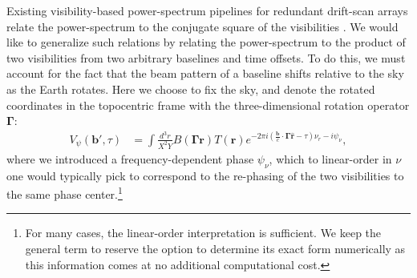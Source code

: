 \documentclass[twocolumn,apj,numberedappendix]{emulateapj}
\renewcommand\[{\begin{equation}}
\renewcommand\]{\end{equation}}
\begin{document}
Existing visibility-based power-spectrum pipelines for redundant drift-scan  arrays relate the power-spectrum to the conjugate square of the visibilities \citep{delay-transform, paper32, Ali2015}. We would like to generalize such relations by relating the power-spectrum to the product of two visibilities from two arbitrary baselines and time offsets. 
To do this, we must account for the fact that the beam pattern of a baseline shifts relative to the sky as the Earth rotates. Here we choose to fix the sky, and denote the rotated coordinates
in the topocentric frame with the three-dimensional rotation operator $\boldsymbol{\Gamma}$:
\[
\begin{aligned}V_{\psi}(\boldsymbol{b'},\tau) & = \int\frac{d^{3}r}{X^{2}Y}B(\boldsymbol{\Gamma}\boldsymbol{r})T(\boldsymbol{r}) e^{-2\pi i\left(\frac{\boldsymbol{b}}{c}\cdot\boldsymbol{\Gamma}\hat{\boldsymbol{r}}-\tau\right)\nu_{r}-i\psi_\nu},\end{aligned}
\]
where we introduced a frequency-dependent phase $\psi_{\nu}$, which to linear-order in $\nu$ one would typically pick to correspond to the re-phasing of the two visibilities to the same phase center.\footnote{For many cases, the linear-order interpretation is sufficient. We keep the general term to reserve the option to determine its exact form numerically as this information comes at no additional computational cost.} 
\end{document}
